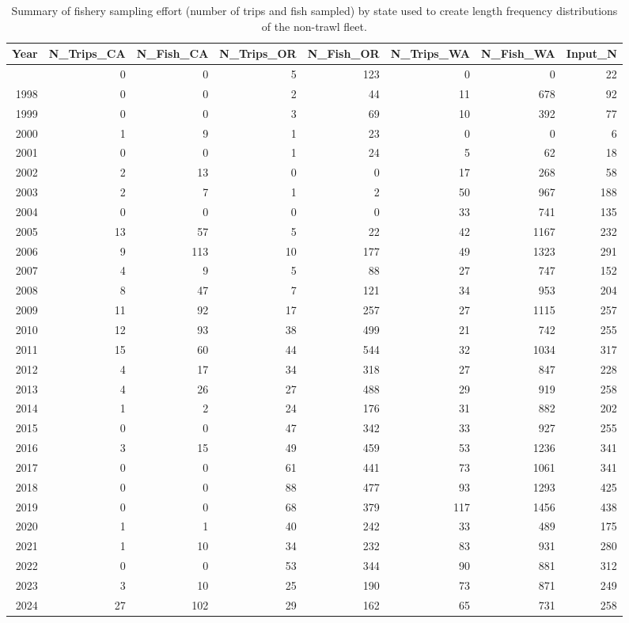\documentclass[
]{scrartcl}
\begin{document}
\begin{longtable}{rrrrrrrr}
\end{longtable}

\endgroup

\newpage{}

\begingroup
\fontsize{9.0pt}{10.8pt}\selectfont

\begin{longtable}{rrrrrrrr}

\caption{\label{tbl-NT_lengths_sample_sizes}Summary of fishery sampling
effort (number of trips and fish sampled) by state used to create length
frequency distributions of the non-trawl fleet.}

\tabularnewline

\toprule
Year & N\_Trips\_CA & N\_Fish\_CA & N\_Trips\_OR & N\_Fish\_OR & N\_Trips\_WA & N\_Fish\_WA & Input\_N \\ 
\midrule\addlinespace[2.5pt]
1996 & 0 & 0 & 5 & 123 & 0 & 0 & 22 \\ 
1998 & 0 & 0 & 2 & 44 & 11 & 678 & 92 \\ 
1999 & 0 & 0 & 3 & 69 & 10 & 392 & 77 \\ 
2000 & 1 & 9 & 1 & 23 & 0 & 0 & 6 \\ 
2001 & 0 & 0 & 1 & 24 & 5 & 62 & 18 \\ 
2002 & 2 & 13 & 0 & 0 & 17 & 268 & 58 \\ 
2003 & 2 & 7 & 1 & 2 & 50 & 967 & 188 \\ 
2004 & 0 & 0 & 0 & 0 & 33 & 741 & 135 \\ 
2005 & 13 & 57 & 5 & 22 & 42 & 1167 & 232 \\ 
2006 & 9 & 113 & 10 & 177 & 49 & 1323 & 291 \\ 
2007 & 4 & 9 & 5 & 88 & 27 & 747 & 152 \\ 
2008 & 8 & 47 & 7 & 121 & 34 & 953 & 204 \\ 
2009 & 11 & 92 & 17 & 257 & 27 & 1115 & 257 \\ 
2010 & 12 & 93 & 38 & 499 & 21 & 742 & 255 \\ 
2011 & 15 & 60 & 44 & 544 & 32 & 1034 & 317 \\ 
2012 & 4 & 17 & 34 & 318 & 27 & 847 & 228 \\ 
2013 & 4 & 26 & 27 & 488 & 29 & 919 & 258 \\ 
2014 & 1 & 2 & 24 & 176 & 31 & 882 & 202 \\ 
2015 & 0 & 0 & 47 & 342 & 33 & 927 & 255 \\ 
2016 & 3 & 15 & 49 & 459 & 53 & 1236 & 341 \\ 
2017 & 0 & 0 & 61 & 441 & 73 & 1061 & 341 \\ 
2018 & 0 & 0 & 88 & 477 & 93 & 1293 & 425 \\ 
2019 & 0 & 0 & 68 & 379 & 117 & 1456 & 438 \\ 
2020 & 1 & 1 & 40 & 242 & 33 & 489 & 175 \\ 
2021 & 1 & 10 & 34 & 232 & 83 & 931 & 280 \\ 
2022 & 0 & 0 & 53 & 344 & 90 & 881 & 312 \\ 
2023 & 3 & 10 & 25 & 190 & 73 & 871 & 249 \\ 
2024 & 27 & 102 & 29 & 162 & 65 & 731 & 258 \\ 
\bottomrule


\end{longtable}
\end{document}
